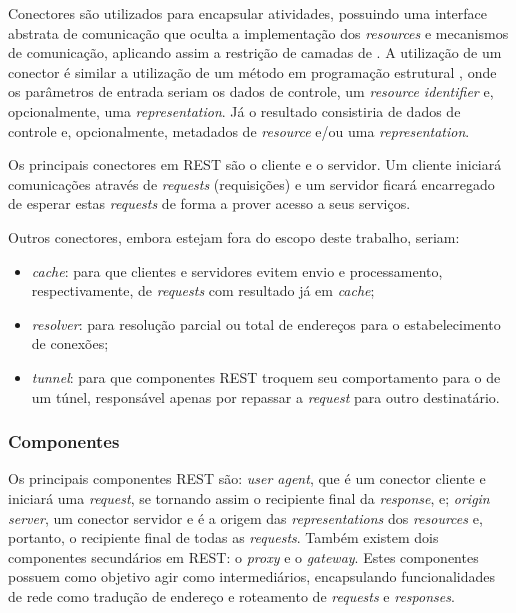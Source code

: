 Conectores são utilizados para encapsular atividades, possuindo uma interface abstrata de comunicação que oculta a implementação dos \textit{resources} e mecanismos de comunicação, aplicando assim a restrição de camadas de . A utilização de um conector é similar a utilização de um método em programação estrutural \cite{WATT:2004}, onde os parâmetros de entrada seriam os dados de controle, um \textit{resource identifier} e, opcionalmente, uma \textit{representation}. Já o resultado consistiria de dados de controle e, opcionalmente, metadados de \textit{resource} e/ou uma \textit{representation}.

Os principais conectores em REST são o cliente e o servidor. Um cliente iniciará comunicações através de \textit{requests} (requisições) e um servidor ficará encarregado de esperar estas \textit{requests} de forma a prover acesso a seus serviços.

Outros conectores, embora estejam fora do escopo deste trabalho, seriam:

\begin{itemize}
    \item \textit{cache}: para que clientes e servidores evitem envio e processamento, respectivamente, de \textit{requests} com resultado já em \textit{cache};
    \item \textit{resolver}: para resolução parcial ou total de endereços para o estabelecimento de conexões;
    \item \textit{tunnel}: para que componentes REST troquem seu comportamento para o de um túnel, responsável apenas por repassar a \textit{request} para outro destinatário.
\end{itemize}




\subsubsection{Componentes}

Os principais componentes REST são: \textit{user agent}, que é um conector cliente e iniciará uma \textit{request}, se tornando assim o recipiente final da \textit{response}, e; \textit{origin server}, um conector servidor e é a origem das \textit{representations} dos \textit{resources} e, portanto, o recipiente final de todas as \textit{requests}. Também existem dois componentes secundários em REST: o \textit{proxy} \cite{WWWProxy:1994} e o \textit{gateway}. Estes componentes possuem como objetivo agir como intermediários, encapsulando funcionalidades de rede como tradução de endereço e roteamento de \textit{requests} e \textit{responses}.

